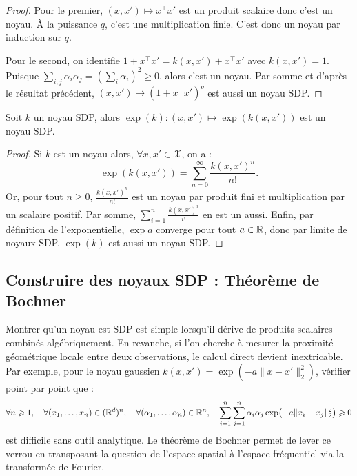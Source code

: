 \begin{proof}
    Pour le premier, $(x, x') \mapsto x^\top x'$ est un produit scalaire donc c'est un noyau. À la puissance $q$, c'est une multiplication finie. C'est donc un noyau par induction sur $q$. 

    Pour le second, on identifie $ 1 + x^\top x' = k(x, x') + x^\top x'$ avec $ k(x, x') = 1$. Puisque $ \sum_{i,j} \alpha_i \alpha_j = \left( \sum_{i} \alpha_i \right)^2 \geqslant 0$, alors c'est un noyau. Par somme et d'après le résultat précédent, $(x, x') \longmapsto (1 + x^\top x')^q$ est aussi un noyau SDP. 
\end{proof}

\begin{proposition}
    Soit $k$ un noyau SDP, alors $ \exp(k) : (x, x') \longmapsto \exp(k(x, x'))$ est un noyau SDP. 
\end{proposition}

\begin{proof}
    Si $k$ est un noyau alors, $ \forall x, x' \in \mathcal{X}$, on a : 
    $$ \exp(k(x, x')) = \sum_{n=0}^{\infty} \frac{k(x, x')^n}{n !}. $$
    Or, pour tout $ n \geqslant 0$, $\frac{k(x, x')^n}{n !}$ est un noyau par produit fini et multiplication par un scalaire positif. Par somme, $\sum_{i=1}^{n} \frac{k(x, x')^i}{i !}$ en est un aussi. Enfin, par définition de l'exponentielle, $ \exp a $ converge pour tout $a \in \mathbb{R}$, donc par limite de noyaux SDP, $ \exp (k)$ est aussi un noyau SDP. 
\end{proof}

\subsection{Construire des noyaux SDP : Théorème de Bochner}

Montrer qu'un noyau est SDP est simple lorsqu'il dérive de produits scalaires combinés algébriquement. En revanche, si l'on cherche à mesurer la proximité géométrique locale entre deux observations, le calcul direct devient inextricable. Par exemple, pour le noyau gaussien $k(x, x') = \exp(-a \|x - x'\|_2^2)$, vérifier point par point que :
\begin{equation*}
    \forall n \geqslant 1, \quad \forall (x_1, \dots, x_n) \in (\mathbb{R}^d)^n, \quad \forall (\alpha_1, \dots, \alpha_n) \in \mathbb{R}^n, \quad \sum_{i=1}^n \sum_{j=1}^n \alpha_i \alpha_j \exp(-a \|x_i - x_j\|_2^2) \geqslant 0
\end{equation*}
est difficile sans outil analytique. Le théorème de Bochner permet de lever ce verrou en transposant la question de l'espace spatial à l'espace fréquentiel via la transformée de Fourier.

